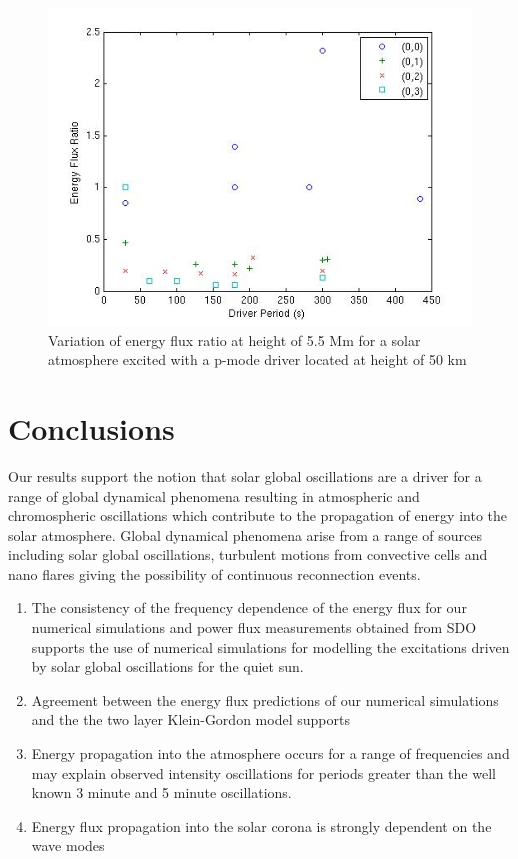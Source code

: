 \documentclass[authoryear,final,1p]{elsarticle}
\begin{document}
\begin{figure}[h]
\includegraphics[scale=0.6]{imagesn/ratio_varoverconst_eflux_vperiod_for modes_5p5Mm.jpg}
\caption{Variation of energy flux ratio at height of 5.5 Mm for a solar atmosphere excited with a p-mode driver located 
at height of 50 km}
\label{Fig20}
\end{figure}

\section{Conclusions}

Our results support the notion that solar global oscillations are a driver for a range of global dynamical phenomena 
resulting in atmospheric and chromospheric oscillations which contribute to the propagation of energy into the solar 
atmosphere.  Global dynamical phenomena arise from a range of sources including solar global oscillations, turbulent 
motions from convective cells and nano flares giving the possibility of continuous reconnection events.
   \begin{enumerate}
      \item The  consistency of the frequency dependence of the energy flux for our numerical simulations and power 
      flux measurements obtained from SDO supports the use of numerical simulations for modelling the excitations 
      driven by solar global oscillations for the quiet sun.
      \item Agreement between the energy flux predictions of our numerical simulations and the the two layer 
      Klein-Gordon model supports
      \item Energy propagation into the atmosphere occurs for a range of frequencies and may explain observed 
      intensity oscillations for periods greater than the well known 3 minute and 5 minute oscillations.  
      \item Energy flux propagation into the solar corona is strongly dependent on the wave modes
   \end{enumerate}
\end{document}
